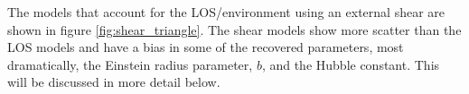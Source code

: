 The models that account for the LOS/environment using an external shear are shown in figure \ref{fig:shear_triangle}. The shear models show more scatter than the LOS models and have a bias in some of the recovered parameters, most dramatically, the Einstein radius parameter, $b$, and the Hubble constant. This will be discussed in more detail below.